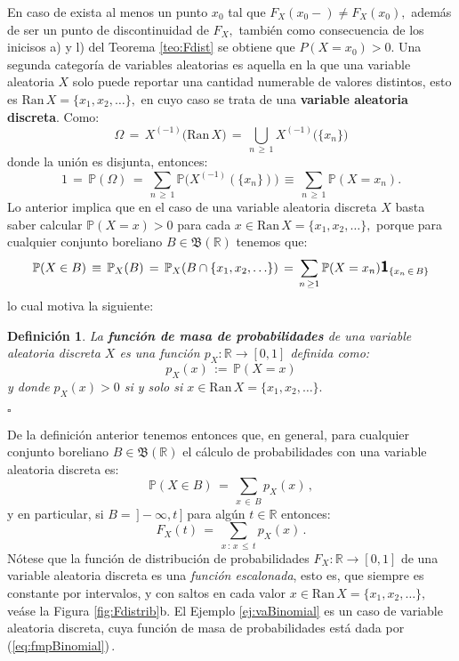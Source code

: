 \documentclass[spanish,10pt,letterpaper]{article}
\newtheorem{defi}{Definición}
\newcommand{\prob}{\mathbb{P}}
\newcommand{\Runo}{\mathbb{R}}
\newcommand{\indic}{\textbf{\textsf{\large{1}}}}
\newcommand{\qed}{\begin{flushright}$\square$\end{flushright}}
\begin{document}
	En caso de exista al menos un punto $x_0$ tal que $F_X(x_0-)\neq F_X(x_0),$ además de ser un punto de discontinuidad de $F_X,$ también como consecuencia de los inicisos a) y l) del Teorema \ref{teo:Fdist} se obtiene que $P(X=x_0)>0.$ Una segunda categoría de variables aleatorias es aquella en la que una variable aleatoria $X$ solo puede reportar una cantidad numerable de valores distintos, esto es $\text{Ran}\,X=\{x_1,x_2,\ldots\},$ en cuyo caso se trata de una \textbf{variable aleatoria discreta}. Como:
	\begin{equation*}
		\Omega \,=\, X^{(-1)}\big(\text{Ran}\,X\big) \,=\, \bigcup_{n\,\geq\,1}X^{(-1)}\big(\{x_n\}\big)
	\end{equation*}
	donde la unión es disjunta, entonces:
	\begin{equation*}
		1 \,=\, \prob(\Omega) \,=\, \sum_{n\,\geq\,1}\prob\big(X^{(-1)}(\{x_n\})\big) \,\equiv\, \sum_{n\,\geq\,1}\prob(X=x_n).
	\end{equation*}
	Lo anterior implica que en el caso de una variable aleatoria discreta $X$ basta saber calcular $\prob(X=x)>0$ para cada $x\in\text{Ran}\,X=\{x_1,x_2,\ldots\},$ porque para cualquier conjunto boreliano $B\in\mathfrak{B}(\Runo)$ tenemos que:
	\begin{equation}\label{eq:fmp}
		\prob(X\in B) \,\equiv\, \prob_X(B) \,=\, \prob_X(B\cap\{x_1,x_2,\ldots\}) \,=\, \sum_{n\,\geq 1}\prob(X=x_n)\indic_{\{x_n\,\in\,B\}} 
	\end{equation}
	lo cual motiva la siguiente:
	
	\bigskip 
	
	\begin{defi}\label{def:fmp}
		La \textbf{función de masa de probabilidades} de una variable aleatoria discreta $X$ es una función $p_X:\Runo\rightarrow[0,1]$ definida como:
		$$p_X(x) \,:=\, \prob(X=x)$$
		y donde $p_X(x)>0$ si y solo si $x\in\text{Ran}\,X=\{x_1,x_2,\ldots\}.$ \qed 
	\end{defi}
	De la definición anterior tenemos entonces que, en general, para cualquier conjunto boreliano $B\in\mathfrak{B}(\Runo)$ el cálculo de probabilidades con una variable aleatoria discreta es:
	\begin{equation}\label{eq:fmp2}
		\prob(X\in B) \,=\, \sum_{x\,\in\,B}p_X(x)\,,
	\end{equation}
	y en particular, si $B=\,]-\infty,t\,]$ para algún $t\in\Runo$ entonces:
	\begin{equation}\label{eq:fmp3}
		F_X(t) \,=\, \sum_{x\,:\,x\,\leq\,t}p_X(x)\,.
	\end{equation}
	Nótese que la función de distribución de probabilidades $F_X:\Runo\rightarrow[0,1]$ de una variable aleatoria discreta es una \textit{función escalonada}, esto es, que siempre es constante por intervalos, y con saltos en cada valor $x\in\text{Ran}\,X=\{x_1,x_2,\ldots\},$ veáse la Figura \ref{fig:Fdistrib}b. El Ejemplo \ref{ej:vaBinomial} es un caso de variable aleatoria discreta, cuya función de masa de probabilidades está dada por (\ref{eq:fmpBinomial})\,.
	
\end{document}
